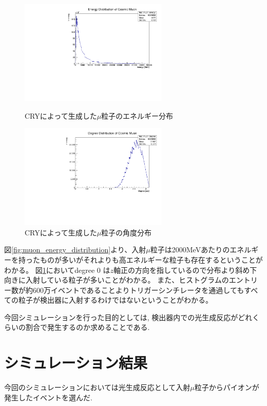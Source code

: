 \begin{figure}[H]
    \begin{minipage}[b]{0.47\linewidth}
        \centering
        \includegraphics[height=5cm]{img/muon_energy_distribution.pdf}
        \caption{CRYによって生成した$\mu$粒子のエネルギー分布}
        \label{fig:muon_energy_distribution}
    \end{minipage}
    \begin{minipage}[b]{0.47\linewidth}
        \centering
        \includegraphics[height=5cm]{img/muon_degree_distribution.pdf}
        \caption{CRYによって生成した$\mu$粒子の角度分布}
        \label{fig:muon_degree_distribution}
    \end{minipage}
\end{figure}
図\ref{fig:muon_energy_distribution}より、入射$\mu$粒子は2000MeVあたりのエネルギーを持ったものが多いがそれよりも高エネルギーな粒子も存在するということがわかる。
図\ref{fig:muon_degree_distribution}においてdegree 0 は$z$軸正の方向を指しているので分布より斜め下向きに入射している粒子が多いことがわかる。
また、ヒストグラムのエントリー数が約600万イベントであることよりトリガーシンチレータを通過してもすべての粒子が検出器に入射するわけではないということがわかる。

今回シミュレーションを行った目的としては, 検出器内での光生成反応がどれくらいの割合で発生するのか求めることである.

\section{シミュレーション結果}
今回のシミュレーションにおいては光生成反応として入射$\mu$粒子からパイオンが発生したイベントを選んだ.

